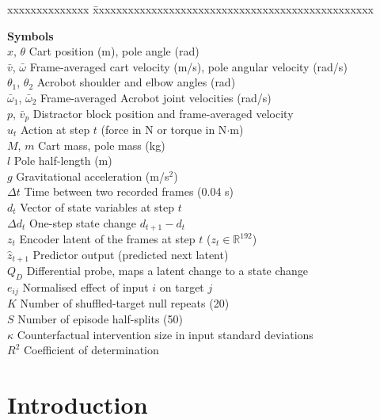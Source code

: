 \documentclass[11pt, a4paper, oneside,enumerate,textcomp]{report}
\newcommand{\vb}{\bar{v}}
\newcommand{\wb}{\bar{\omega}}
\newcommand{\zh}{\hat{z}}
\newcommand{\dd}{\Delta}
\newcommand{\Rsq}{R^2}
\begin{document}
\begin{tabbing}
	xxxxxxxxxxxxxx  \=  xxxxxxxxxxxxxxxxxxxxxxxxxxxxxxxxxxxxxxxxxxxxxxxx \kill

	\textbf{Symbols}\\
	$x$, $\theta$ \> Cart position (m), pole angle (rad) \\
	$\vb$, $\wb$ \> Frame-averaged cart velocity (m/s), pole angular velocity (rad/s) \\
	$\theta_1$, $\theta_2$ \> Acrobot shoulder and elbow angles (rad) \\
	$\wb_1$, $\wb_2$ \> Frame-averaged Acrobot joint velocities (rad/s) \\
	$p$, $\vb_p$ \> Distractor block position and frame-averaged velocity \\
	$u_t$ \> Action at step $t$ (force in N or torque in N$\cdot$m) \\
	$M$, $m$ \> Cart mass, pole mass (kg) \\
	$l$ \> Pole half-length (m) \\
	$g$ \> Gravitational acceleration (m/s$^2$) \\
	$\Delta t$ \> Time between two recorded frames (0.04 s) \\
	$d_t$ \> Vector of state variables at step $t$ \\
	$\dd d_t$ \> One-step state change $d_{t+1}-d_t$ \\
	$z_t$ \> Encoder latent of the frames at step $t$ ($z_t \in \mathbb{R}^{192}$) \\
	$\zh_{t+1}$ \> Predictor output (predicted next latent) \\
	$Q_D$ \> Differential probe, maps a latent change to a state change \\
	$e_{ij}$ \> Normalised effect of input $i$ on target $j$ \\
	$K$ \> Number of shuffled-target null repeats (20) \\
	$S$ \> Number of episode half-splits (50) \\
	$\kappa$ \> Counterfactual intervention size in input standard deviations \\
	$\Rsq$ \> Coefficient of determination \\
\end{tabbing}


\newpage

\setcounter{page}{1}
\chapter{Introduction}
\thispagestyle{empty}
\end{document}
